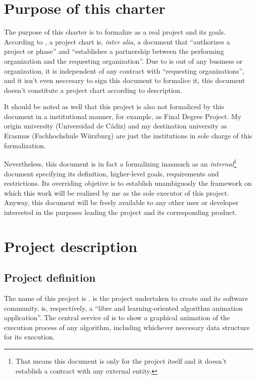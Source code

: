 \documentclass[twocolumn]{article}
\begin{document}
\section{Purpose of this charter}
\label{sec:purpose}
The purpose of this charter is to formalize \favp as a real
project and its goals. According to \pmbok, a project chart is,
\textit{inter alia}, a document that
``authorizes a project or phase'' and ``establishes a
partnership between the performing organization and the requesting
organization''. Due to \favp is out of any business
or organization, it is independent of any contract with ``requesting
organizations'', and it isn't even neccesary to sign this document to
formalice it, this document doesn't constitute a project chart
according to \pmbok description.

It should be noted as well that this project is also not formaliced by
this document in a institutional manner, for example, as Final Degree
Project. My origin university (Universidad de Cádiz) and my
destination university as Erasmus (Fachhochshule Würzburg) are just
the institutions in sole charge of this formalization.

Nevertheless, this document is in fact a \chart formalizing \favp
inasmuch as an \textit{internal}\footnote{That means this document is
  only for the project itself and it doesn't establish a contract with
  any external entity.} document specifying its definition,
higher-level goals, requirements and restrictions. Its overriding
objetive is to establish unambiguosly the framework on which this work
will be realized by me as the sole executor of this project. Anyway,
this document will be freely available to any other user or developer
interested in the purposes leading the project and its corresponding
product.

\section{Project description}
\subsection{Project definition}
The name of this project is \favp. \favp is the project undertaken to
create \fav and its software community. \fav is, respectively, a
``libre and learning-oriented algorithm animation application''. The
central service of \fav is to show a graphical animation of the execution
process of any algorithm, including whichever neccesary data structure
for its execution.
\end{document}
